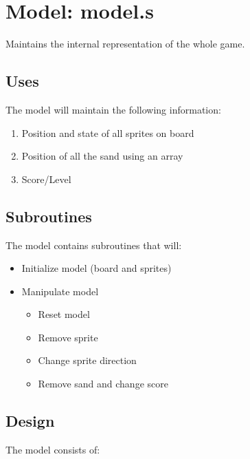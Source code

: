 \section{Model: model.s}

Maintains the internal representation of the whole game.

\subsection{Uses}

The model will maintain the following information:

\begin{enumerate}
	\item Position and state of all sprites on board
	\item Position of all the sand using an array
	\item Score/Level
\end{enumerate}

\subsection{Subroutines}

The model contains subroutines that will:

\begin{itemize}
  \item Initialize model (board and sprites)
  \item Manipulate model
  \begin{itemize}
    \item Reset model
    \item Remove sprite
    \item Change sprite direction
    \item Remove sand and change score
  \end{itemize}
\end{itemize}

\subsection{Design}

The model consists of:

